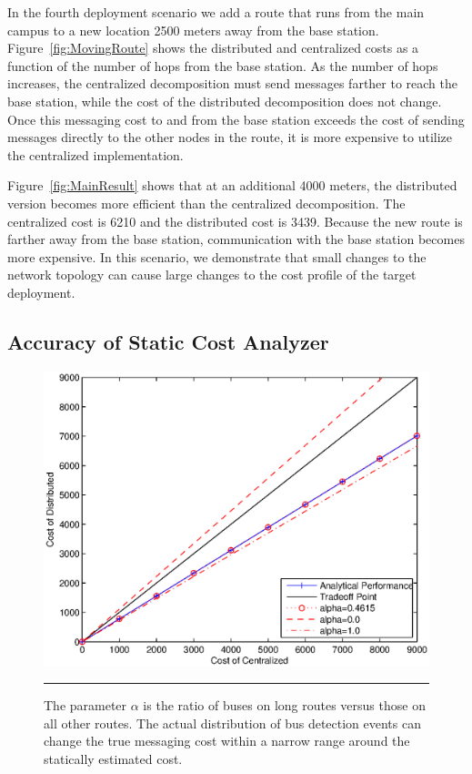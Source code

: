 In the fourth deployment scenario we add a route that runs from the main
campus to a new location 2500 meters away from the base station.
Figure~\ref{fig:MovingRoute} shows the distributed and centralized costs
as a function of the number of hops from the base station. As the number of hops
increases, the centralized decomposition must send messages farther to
reach the base station, while the cost of the distributed decomposition
does not change. Once this messaging cost to and from the base station
exceeds the cost of sending messages directly to the other nodes in the
route, it is more expensive to utilize the centralized implementation.

Figure~\ref{fig:MainResult} shows that at an additional 4000 meters, the
distributed version becomes more efficient than the centralized
decomposition. The centralized cost is 6210 and the distributed cost is
3439.  Because the new route is farther away from the base station,
communication with the base station becomes more expensive.  In this
scenario, we demonstrate that small changes to the network topology can
cause large changes to the cost profile of the target deployment.

\subsection{Accuracy of Static Cost Analyzer}
\label{sect:analysisAccuracy}
\begin{figure}
  \centering
  \includegraphics[width=1\columnwidth]{fig/Buses}
  \smallskip
  \hrule
  \caption[Estimated and measured messaging costs.]{The parameter
  $\alpha$ is the ratio of buses on long routes versus those on all
  other routes. The actual distribution of bus detection events can change the
  true messaging cost within a narrow range around the statically estimated cost.
  }
  \label{fig:Buses}
\end{figure}


